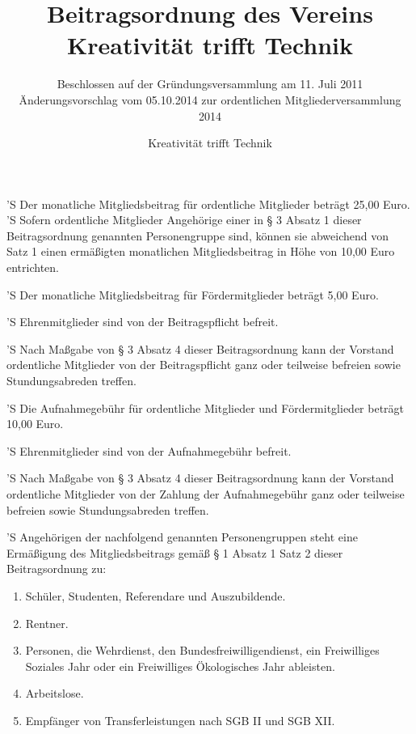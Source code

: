 \documentclass[a4paper,10pt]{scrreprt}
\begin{document}
\title{Beitragsordnung des Vereins\\Kreativität trifft Technik}
\subtitle{
	Beschlossen auf der Gründungsversammlung am 11. Juli 2011\\
	Änderungsvorschlag vom 05.10.2014 zur ordentlichen Mitgliederversammlung 2014
}
\author{Kreativität trifft Technik}



\begin{contract}


'S Der monatliche Mitgliedsbeitrag für ordentliche Mitglieder beträgt 25,00
Euro.
'S Sofern ordentliche Mitglieder Angehörige einer in § 3 Absatz 1 dieser
Beitragsordnung genannten Personengruppe sind, können sie abweichend von
Satz 1 einen ermäßigten monatlichen Mitgliedsbeitrag in Höhe von 10,00
Euro entrichten.

'S Der monatliche Mitgliedsbeitrag für Fördermitglieder beträgt 5,00 Euro.

'S Ehrenmitglieder sind von der Beitragspflicht befreit.

'S Nach Maßgabe von § 3 Absatz 4 dieser Beitragsordnung kann der Vorstand
ordentliche Mitglieder von der Beitragspflicht ganz oder teilweise befreien
sowie Stundungsabreden treffen.


'S Die Aufnahmegebühr für ordentliche Mitglieder und Fördermitglieder beträgt
10,00 Euro.

'S Ehrenmitglieder sind von der Aufnahmegebühr befreit.

'S Nach Maßgabe von § 3 Absatz 4 dieser Beitragsordnung kann der Vorstand
ordentliche Mitglieder von der Zahlung der Aufnahmegebühr ganz oder teilweise
befreien sowie Stundungsabreden treffen.


'S Angehörigen der nachfolgend genannten Personengruppen steht eine Ermäßigung
des Mitgliedsbeitrags gemäß § 1 Absatz 1 Satz 2 dieser Beitragsordnung zu:
\begin{enumerate}
	\item Schüler, Studenten, Referendare und Auszubildende.
	\item Rentner.
	\item Personen, die Wehrdienst, den Bundesfreiwilligendienst, ein
          Freiwilliges Soziales Jahr oder ein Freiwilliges Ökologisches
          Jahr ableisten.
	\item Arbeitslose.
	\item Empfänger von Transferleistungen nach SGB II und SGB XII.
\end{enumerate}


\end{contract}
\end{document}
